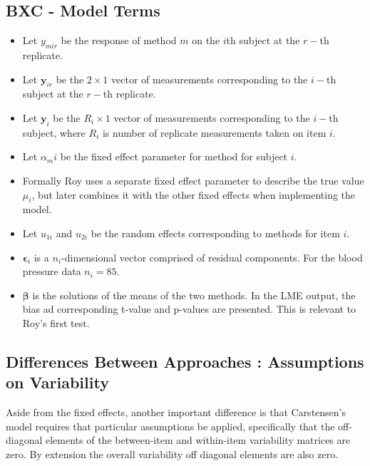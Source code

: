 \documentclass[12pt, a4paper]{report}
\theoremstyle{plain}
\theoremstyle{definition}
\theoremstyle{remark}
\begin{document}
	\subsection{BXC - Model Terms}
	\begin{itemize}
		\item Let $y_{mir}$ be the response of method $m$ on the $i$th subject
		at the $r-$th replicate.
		\item Let $\boldsymbol{y}_{ir}$ be the $2 \times 1$ vector of measurements
		corresponding to the $i-$th subject at the $r-$th replicate.
		\item Let $\boldsymbol{y}_{i}$ be the $R_i \times 1$ vector of
		measurements corresponding to the $i-$th subject, where $R_i$ is number of replicate measurements taken on item $i$.
		\item Let $\alpha_mi$ be the fixed effect parameter for method for subject $i$.
		\item Formally Roy uses a separate fixed effect parameter to describe the true value $\mu_i$, but later combines it with the other fixed effects when implementing the model.
		\item Let $u_{1i}$ and $u_{2i}$ be the random effects corresponding to methods for item $i$.
		
		\item $\boldsymbol{\epsilon}_{i}$ is a $n_{i}$-dimensional vector
		comprised of residual components. For the blood pressure data $n_{i} = 85$.
		
		\item $\boldsymbol{\beta}$ is the solutions of the means of the two methods. In the LME output, the bias ad corresponding
		t-value and p-values are presented. This is relevant to Roy's first test.\end{itemize}
	

	
	
	
	
	

	\subsection{Differences Between Approaches : Assumptions on Variability}
	Aside from the fixed effects, another important difference is that Carstensen's model requires that particular assumptions be applied, specifically that the off-diagonal elements of the between-item
	and within-item variability matrices are zero. By extension the
	overall variability off diagonal elements are also zero.
	
\end{document}
